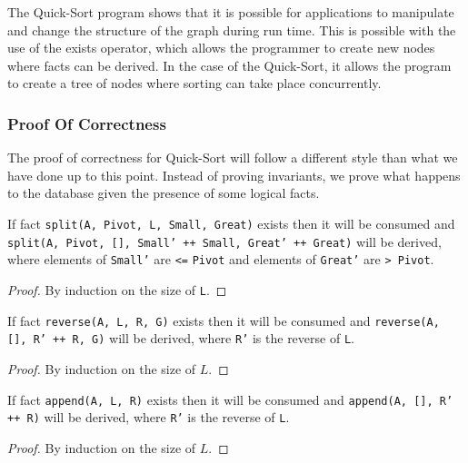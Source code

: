 The Quick-Sort program shows that it is possible for applications to manipulate
and change the structure of the graph during run time. This is possible with the
use of the exists operator, which allows the programmer to create new nodes
where facts can be derived. In the case of the Quick-Sort, it allows the program
to create a tree of nodes where sorting can take place concurrently.

\subsubsection{Proof Of Correctness}

The proof of correctness for Quick-Sort will follow a different style than what
we have done up to this point. Instead of proving invariants, we prove what
happens to the database given the presence of some logical facts.

\begin{lemma}

If fact \texttt{split(A, Pivot, L, Small, Great)} exists then it will be
consumed and \texttt{split(A, Pivot, [], Small' ++ Small, Great' ++ Great)} will
be derived, where elements of \texttt{Small'} are \texttt{<=} \texttt{Pivot} and
elements of \texttt{Great'} are \texttt{> Pivot}.

\end{lemma}
\begin{proof}
By induction on the size of \texttt{L}.
\end{proof}

\begin{lemma}

If fact \texttt{reverse(A, L, R, G)} exists then it will be consumed and
\texttt{reverse(A, [], R' ++ R, G)} will be derived, where \texttt{R'} is the
reverse of \texttt{L}.

\end{lemma}
\begin{proof}
By induction on the size of $L$.
\end{proof}

\begin{lemma}
If fact \texttt{append(A, L, R)} exists then it will be consumed and
\texttt{append(A, [], R' ++ R)} will be derived, where \texttt{R'} is the reverse of \texttt{L}.
\end{lemma}
\begin{proof}
By induction on the size of $L$.
\end{proof}

